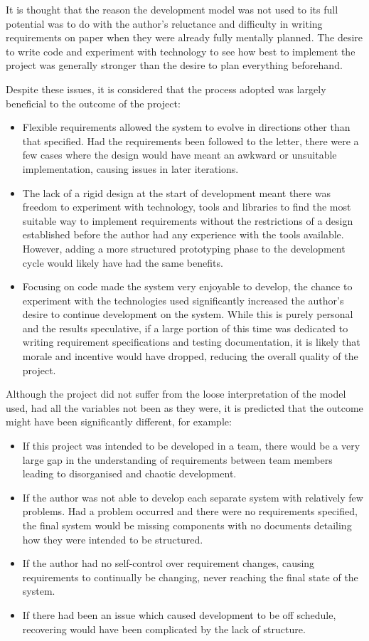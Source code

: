 \documentclass[a4papert,11pt,notitlepage]{article}
\begin{document}
It is thought that the reason the development model was not used to its full potential was to do with the author's reluctance and difficulty in writing requirements on paper when they were already fully mentally planned. The desire to write code and experiment with technology to see how best to implement the project was generally stronger than the desire to plan everything beforehand.

Despite these issues, it is considered that the process adopted was largely beneficial to the outcome of the project:
\begin{itemize}
\item Flexible requirements allowed the system to evolve in directions other than that specified. Had the requirements been followed to the letter, there were a few cases where the design would have meant an awkward or unsuitable implementation, causing issues in later iterations.
\item The lack of a rigid design at the start of development meant there was freedom to experiment with technology, tools and libraries to find the most suitable way to implement requirements without the restrictions of a design established before the author had any experience with the tools available. However, adding a more structured prototyping phase to the development cycle would likely have had the same benefits.
\item Focusing on code made the system very enjoyable to develop, the chance to experiment with the technologies used significantly increased the author's desire to continue development on the system. While this is purely personal and the results speculative, if a large portion of this time was dedicated to writing requirement specifications and testing documentation, it is likely that morale and incentive would have dropped, reducing the overall quality of the project.
\end{itemize}

Although the project did not suffer from the loose interpretation of the model used, had all the variables not been as they were, it is predicted that the outcome might have been significantly different, for example:
\begin{itemize}
\item If this project was intended to be developed in a team, there would be a very large gap in the understanding of requirements between team members leading to disorganised and chaotic development.
\item If the author was not able to develop each separate system with relatively few problems. Had a problem occurred and there were no requirements specified, the final system would be missing components with no documents detailing how they were intended to be structured.
\item If the author had no self-control over requirement changes, causing requirements to continually be changing, never reaching the final state of the system.
\item If there had been an issue which caused development to be off schedule, recovering would have been complicated by the lack of structure.
\end{itemize}
\end{document}
